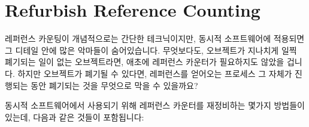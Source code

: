 
\section{Refurbish Reference Counting}
\label{sec:together:Refurbish Reference Counting}

레퍼런스 카운팅이 개념적으로는 간단한 테크닉이지만, 동시적 소프트웨어에
적용되면 그 디테일 안에 많은 악마들이 숨어있습니다.
무엇보다도, 오브젝트가 지나치게 일찍 폐기되는 일이 없는 오브젝트라면, 애초에
레퍼런스 카운터가 필요하지도 않았을 겁니다.
하지만 오브젝트가 폐기될 수 있다면, 레퍼런스를 얻어오는 프로세스 그 자체가
진행되는 동안 폐기되는 것을 무엇으로 막을 수 있을까요?

동시적 소프트웨어에서 사용되기 위해 레퍼런스 카운터를 재정비하는 몇가지
방법들이 있는데, 다음과 같은 것들이 포함됩니다:
\iffalse

Although reference counting is a conceptually simple technique,
many devils hide in the details when it is applied to concurrent
software.
After all, if the object was not subject to premature disposal,
there would be no need for the reference counter in the first place.
But if the object can be disposed of, what prevents disposal during
the reference-acquisition process itself?

There are a number of ways to refurbish reference counters for
use in concurrent software, including:
\fi

